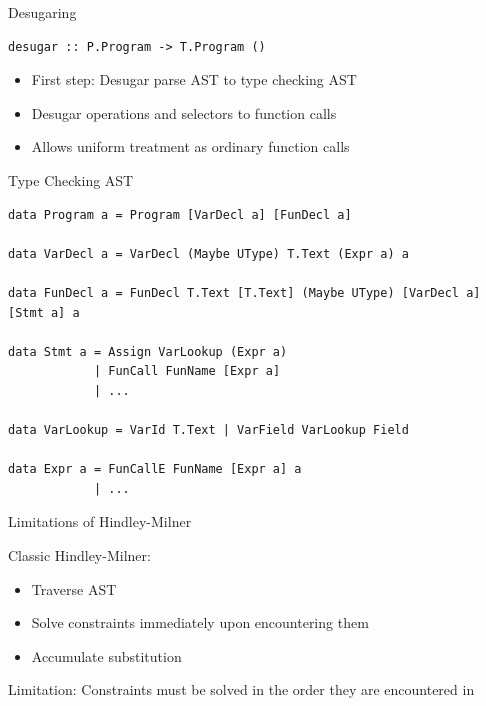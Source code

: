 \documentclass[dvipsnames,aspectratio=169]{beamer}
\begin{document}
\begin{frame}[fragile]{Desugaring}

\begin{verbatim}
desugar :: P.Program -> T.Program ()
\end{verbatim}

\begin{itemize}
  \item First step: Desugar parse AST to type checking AST
  \item Desugar operations and selectors to function calls
  \item Allows uniform treatment as ordinary function calls
\end{itemize}

\end{frame}


\begin{frame}[fragile]{Type Checking AST}

  \begin{verbatim}
data Program a = Program [VarDecl a] [FunDecl a]

data VarDecl a = VarDecl (Maybe UType) T.Text (Expr a) a

data FunDecl a = FunDecl T.Text [T.Text] (Maybe UType) [VarDecl a] [Stmt a] a

data Stmt a = Assign VarLookup (Expr a)
            | FunCall FunName [Expr a]
            | ...

data VarLookup = VarId T.Text | VarField VarLookup Field

data Expr a = FunCallE FunName [Expr a] a
            | ...
\end{verbatim}

\end{frame}


\begin{frame}{Limitations of Hindley-Milner}

  Classic Hindley-Milner:
  \begin{itemize}
    \item Traverse AST
    \item Solve constraints immediately upon encountering them
    \item Accumulate substitution
  \end{itemize}

  Limitation: Constraints must be solved in the order they are encountered in

\end{frame}
\end{document}
